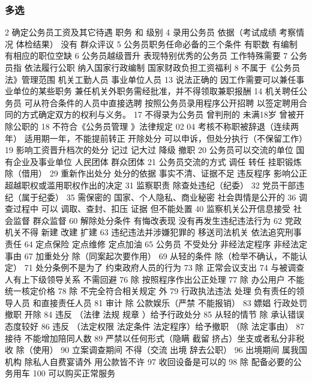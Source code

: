 \documentclass[11pt]{ctexart}
\begin{document}
\subsubsection{多选}
\label{sec:org8731954}
2 确定公务员工资及其它待遇
职务 和 级别
4 录用公务员 依据（考试成绩 考察情况 体检结果）
没有 群众评议
5 公务员职务任命必备的三个条件
有职数 有编制 有相应的职位空缺
6 公务员越级晋升
表现特别优秀的公务员 工作特殊需要
7 公务员指
依法履行公职
纳入国家行政编制
国家财政负担工资福利
8 不属于《公务员法》管理范围
机关工勤人员
事业单位人员
13 说法正确的
因工作需要可以兼任事业单位的某些职务
兼任机关外职务需经批准，并不得领取兼职报酬
14 机关聘任公务员
可从符合条件的人员中直接选聘
按照公务员录用程序公开招聘
以签定聘用合同的方式确定双方的权利与义务。
17 不得录为公务员
曾判刑的 未满18岁 曾被开除公职的
18 不符合《公务员管理 》法律规定
02 04 考核不称职被辞退（连续两年）
适用期一年，不能提前转正
开除处分 可以申诉，但处分执行（不保留工作）
19 影响工资晋升档次的处分
记过 记大过 降级 撤职
20 公务员可以交流的单位
国有企业及事业单位
人民团体
群众团体
21 公务员交流的方式
调任 转任 挂职锻炼 除（借用）
29 重新作出处分
处分的依据 事实不清、证据不足
违反程序 影响公正
超越职权或滥用职权作出的决定
31 监察职责
除查处违纪（纪委）
32 党员干部违纪（属于纪委）
35 需保密的
国家、个人隐私、商业秘密
社会舆情是公开的
36 调查过程中 可以
调取、查封、扣压 证据
但不能处置
40 监察机关公开信息接受
社会监督 群众监督
60 解除处分条件
有悔改表现
没有再发生违纪违法行为
62 党政机关不得
新建 改建 扩建
63 违纪违法并涉嫌犯罪的
移送司法机关
依法追究刑事责任
64 定点保险 定点维修 定点加油
65 公务员 不受处分
非经法定程序
非经法定事由
67 加重处分
除（同案起次要作用）
69 从轻的条件
除（检举不确认，不能认定）
71 处分条例不是为了
约束政府人员的行为
73 除 正常会议支出
74 与被调查人有上下级领导关系 不需回避
76 除 按照程序作出公正处理
77 除 办公用户
不能统一核定价格
78 除 不完全符合相关规定 外
79 行政执法违法 处理
负有责任的领导人员
和直接责任人员
81 审计
除 公款娱乐（严禁 不能报销）
83 嫖娼 行政处罚
撤职 开除
84 违反 （法律 法规 规章 ）给予行政处分
85 从轻的情节
除 承认错误态度较好
86 违反 （法定权限 法定条件 法定程序）给予撤职
（除 法定事由）
87 接待 不能增加陪同人数
89 严禁以任何形式（隐瞒 截留 挤占）坐支或者私分非税收
除（使用）
90 立案调查期间 不得（交流 出境 辞去公职）
96 出境期间 属我国机构 除私人自费宴请外 用公款皆不许
97 收回设备是可以的
98 除 配备必要的公务用车
100 可以购买正常服务
\end{document}
